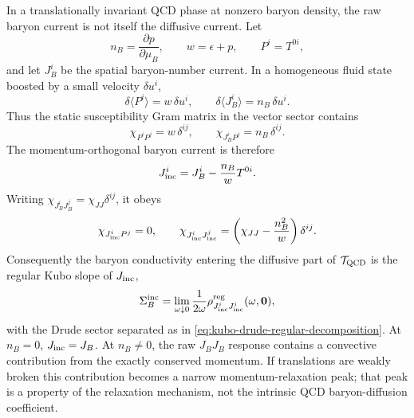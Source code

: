 \begin{proposition}
\label{prop:qcd-incoherent-baryon-current}
In a translationally invariant QCD phase at nonzero baryon density, the raw
baryon current is not itself the diffusive current.  Let
\[
  n_B=\frac{\partial p}{\partial\mu_B},\qquad
  w=\epsilon+p,
  \qquad P^i=T^{0i},
\]
and let \(J_B^i\) be the spatial baryon-number current.  In a homogeneous
fluid state boosted by a small velocity \(\delta u^i\),
\[
  \delta\langle P^i\rangle=w\,\delta u^i,\qquad
  \delta\langle J_B^i\rangle=n_B\,\delta u^i .
\]
Thus the static susceptibility Gram matrix in the vector sector contains
\[
  \chi_{P^iP^j}=w\,\delta^{ij},
  \qquad
  \chi_{J_B^iP^j}=n_B\,\delta^{ij}.
\]
The momentum-orthogonal baryon current is therefore
\begin{equation}
  J_{\rm inc}^i
  =
  J_B^i-\frac{n_B}{w}T^{0i}.
  \label{eq:qcd-incoherent-baryon-current}
\end{equation}
Writing \(\chi_{J_B^iJ_B^j}=\chi_{JJ}\delta^{ij}\), it obeys
\begin{equation}
  \chi_{J_{\rm inc}^iP^j}=0,\qquad
  \chi_{J_{\rm inc}^iJ_{\rm inc}^j}
  =
  \left(\chi_{JJ}-\frac{n_B^2}{w}\right)\delta^{ij}.
  \label{eq:qcd-incoherent-current-gram}
\end{equation}
Consequently the baryon conductivity entering the diffusive part of
\(\mathcal T_{\rm QCD}\) is the regular Kubo slope of
\(J_{\rm inc}\),
\begin{equation}
  \Sigma_B^{\rm inc}
  =
  \lim_{\omega\downarrow0}
  \frac1{2\omega}
  \rho^{\rm reg}_{J_{\rm inc}^iJ_{\rm inc}^i}(\omega,\mathbf0),
  \label{eq:qcd-incoherent-baryon-conductivity}
\end{equation}
with the Drude sector separated as in
\eqref{eq:kubo-drude-regular-decomposition}.  At \(n_B=0\),
\(J_{\rm inc}=J_B\).  At \(n_B\ne0\), the raw
\(J_BJ_B\) response contains a convective contribution from the exactly
conserved momentum.  If translations are weakly broken this contribution
becomes a narrow momentum-relaxation peak; that peak is a property of the
relaxation mechanism, not the intrinsic QCD baryon-diffusion coefficient.
\end{proposition}

